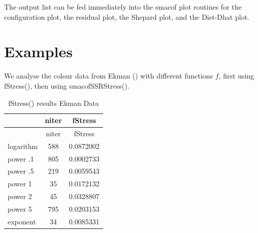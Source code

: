 \documentclass[
  12pt,
  letterpaper,
  DIV=11,
  numbers=noendperiod]{scrartcl}
\newenvironment{Shaded}{\begin{snugshade}}{\end{snugshade}}
\newcommand{\AttributeTok}[1]{\textcolor[rgb]{0.40,0.45,0.13}{#1}}
\newcommand{\FunctionTok}[1]{\textcolor[rgb]{0.28,0.35,0.67}{#1}}
\newcommand{\NormalTok}[1]{\textcolor[rgb]{0.00,0.23,0.31}{#1}}
\newcommand{\SpecialCharTok}[1]{\textcolor[rgb]{0.37,0.37,0.37}{#1}}
\begin{document}
\begin{Shaded}
\end{Shaded}

The output list can be fed immediately into the smacof plot routines for
the configuration plot, the residual plot, the Shepard plot, and the
Dist-Dhat plot.

\section{Examples}\label{examples}

We analyse the colour data from Ekman ()
with different functions \(f\), first using fStress(), then using
smacofSSRStress().

\begin{longtable}[]{@{}lcc@{}}
\caption{fStress() results Ekman Data}\tabularnewline
\toprule\noalign{}
& niter & fStress \\
\midrule\noalign{}
\endfirsthead
\toprule\noalign{}
& niter & fStress \\
\midrule\noalign{}
\endhead
\bottomrule\noalign{}
\endlastfoot
logarithm & 588 & 0.0872002 \\
power .1 & 805 & 0.0002733 \\
power .5 & 219 & 0.0059543 \\
power 1 & 35 & 0.0172132 \\
power 2 & 45 & 0.0328807 \\
power 5 & 795 & 0.0203153 \\
exponent & 34 & 0.0085331 \\
\end{longtable}
\end{document}
